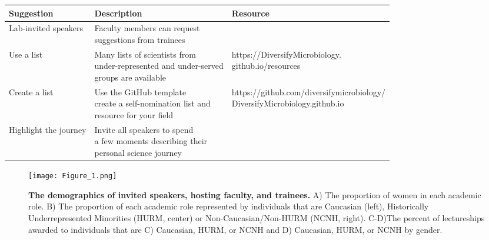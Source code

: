 \documentclass[10pt,]{article}
\begin{document}
\newpage

\begin{center}
\small
\begin{tabular}{|l|l|l|}
\hline

\rowcolor{lightgray}
\textbf{Suggestion} & \textbf{Description} & \textbf{Resource} \\ \hline

Lab-invited speakers & \makecell[l]{Faculty members can request \\suggestions from trainees} & \\ \hline

Use a list & \makecell[l]{Many lists of scientists from \\under-represented and under-served \\groups are available} &  \makecell[l]{https://DiversifyMicrobiology.\\github.io/resources}\\ \hline

Create a list & \makecell[l]{Use the GitHub template \\ create a self-nomination list and \\resource for your field} & \makecell[l]{https://github.com/diversifymicrobiology/\\DiversifyMicrobiology.github.io} \\ \hline

Highlight the journey & \makecell[l]{Invite all speakers to spend \\a few moments describing their \\personal science journey} & \\ \hline

\end{tabular}
\end{center}

\begin{figure}
\centering
\texttt{[image: Figure\_1.png]}
\caption{\textbf{The demographics of invited speakers, hosting faculty,
and trainees.} A) The proportion of women in each academic role. B) The
proportion of each academic role represented by individuals that are
Caucasian (left), Historically Underrepresented Minorities (HURM,
center) or Non-Caucasian/Non-HURM (NCNH, right). C-D)The percent of
lectureships awarded to individuals that are C) Caucasian, HURM, or NCNH
and D) Caucasian, HURM, or NCNH by gender.}
\end{figure}
\end{document}
